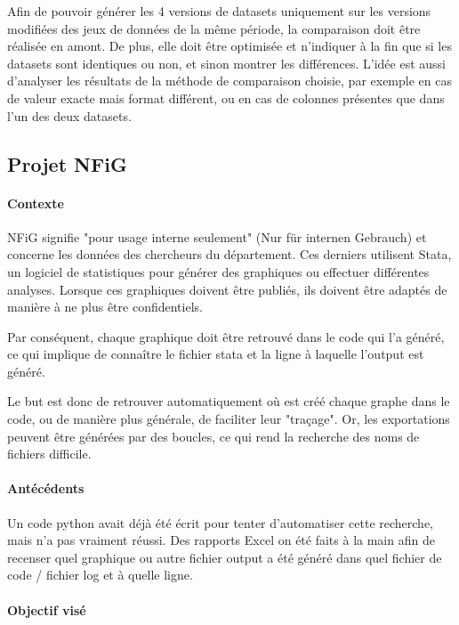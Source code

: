 Afin de pouvoir générer les 4 versions de datasets uniquement sur les versions modifiées des jeux de données de la même période, la comparaison doit être réalisée en amont.
De plus, elle doit être optimisée et n'indiquer à la fin que si les datasets sont identiques ou non, et sinon montrer les différences.
L'idée est aussi d'analyser les résultats de la méthode de comparaison choisie, par exemple en cas de valeur exacte mais format différent, ou en cas de colonnes présentes que dans l'un des deux datasets.
\\
\subsection{Projet NFiG}

\paragraph{Contexte}

NFiG signifie "pour usage interne seulement" (Nur für internen Gebrauch) et concerne les données des chercheurs du département. 
Ces derniers utilisent Stata, un logiciel de statistiques pour générer des graphiques ou effectuer différentes analyses.
Lorsque ces graphiques doivent être publiés, ils doivent être adaptés de manière à ne plus être confidentiels.

Par conséquent, chaque graphique doit être retrouvé dans le code qui l'a généré, ce qui implique de connaître le fichier stata et la ligne à laquelle l'output est généré.

Le but est donc de retrouver automatiquement où est créé chaque graphe dans le code, ou de manière plus générale, de faciliter leur "traçage".
Or, les exportations peuvent être générées par des boucles, ce qui rend la recherche des noms de fichiers difficile.

\paragraph{Antécédents}

Un code python avait déjà été écrit pour tenter d'automatiser cette recherche, mais n'a pas vraiment réussi.
Des rapports Excel on été faits à la main afin de recenser quel graphique ou autre fichier output a été généré dans quel fichier de code / fichier log et à quelle ligne. 

\paragraph{Objectif visé}

